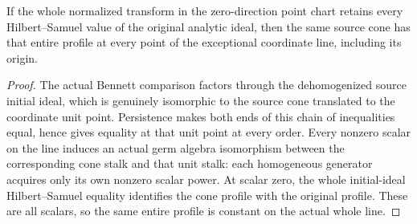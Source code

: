 \begin{lemma}
\label{hir:actual-persistent-point-cone-ray}
\leanok
If the whole normalized transform in the zero-direction point chart retains
every Hilbert--Samuel value of the original analytic ideal, then the same
source cone has that entire profile at every point of the exceptional
coordinate line, including its origin.
\end{lemma}
\begin{proof}
The actual Bennett comparison factors through the dehomogenized source
initial ideal, which is genuinely isomorphic to the source cone translated
to the coordinate unit point. Persistence makes both ends of this chain of
inequalities equal, hence gives equality at that unit point at every order.
Every nonzero scalar on the line induces an actual germ algebra isomorphism
between the corresponding cone stalk and that unit stalk: each homogeneous
generator acquires only its own nonzero scalar power. At scalar zero, the
whole initial-ideal Hilbert--Samuel equality identifies the cone profile
with the original profile. These are all scalars, so the same entire
profile is constant on the actual whole line.
\end{proof}

